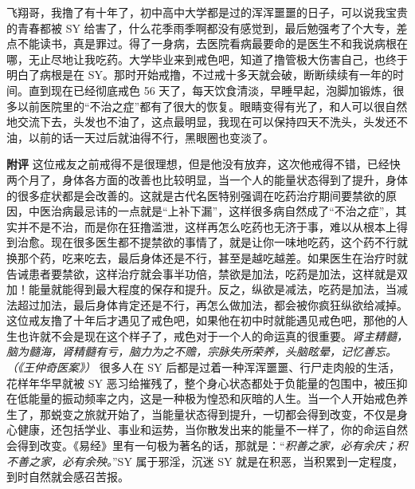 \begin{case}
    飞翔哥，我撸了有十年了，初中高中大学都是过的浑浑噩噩的日子，可以说我宝贵的青春都被 SY 给害了，什么花季雨季啊都没有感觉到，最后勉强考了个大专，差点不能读书，真是罪过。得了一身病，去医院看病最要命的是医生不和我说病根在哪，无止尽地让我吃药。大学毕业来到戒色吧，知道了撸管极大伤害自己，也终于明白了病根是在 SY。那时开始戒撸，不过戒十多天就会破，断断续续有一年的时间。直到现在已经彻底戒色 56 天了，每天饮食清淡，早睡早起，泡脚加锻炼，很多以前医院里的“不治之症”都有了很大的恢复。眼睛变得有光了，和人可以很自然地交流下去，头发也不油了，这点最明显，我现在可以保持四天不洗头，头发还不油，以前的话一天过后就油得不行，黑眼圈也变淡了。

    \textbf{附评} 这位戒友之前戒得不是很理想，但是他没有放弃，这次他戒得不错，已经快两个月了，身体各方面的改善也比较明显，当一个人的能量状态得到了提升，身体的很多症状都是会改善的。这就是古代名医特别强调在吃药治疗期间要禁欲的原因，中医治病最忌讳的一点就是“上补下漏”，这样很多病自然成了“不治之症”，其实并不是不治，而是你在狂撸滥泄，这样再怎么吃药也无济于事，难以从根本上得到治愈。现在很多医生都不提禁欲的事情了，就是让你一味地吃药，这个药不行就换那个药，吃来吃去，最后身体还是不行，甚至是越吃越差。如果医生在治疗时就告诫患者要禁欲，这样治疗就会事半功倍，禁欲是加法，吃药是加法，这样就是双加！能量就能得到最大程度的保存和提升。反之，纵欲是减法，吃药是加法，当减法超过加法，最后身体肯定还是不行，再怎么做加法，都会被你疯狂纵欲给减掉。这位戒友撸了十年后才遇见了戒色吧，如果他在初中时就能遇见戒色吧，那他的人生也许就不会是现在这个样子了，戒色对于一个人的命运真的很重要。\textit{肾主精髓，脑为髓海，肾精髓有亏，脑力为之不赡，宗脉失所荣养，头脑眩晕，记忆善忘。（《王仲奇医案》）} 很多人在 SY 后都是过着一种浑浑噩噩、行尸走肉般的生活，花样年华早就被 SY 恶习给摧残了，整个身心状态都处于负能量的包围中，被压抑在低能量的振动频率之内，这是一种极为惶恐和灰暗的人生。当一个人开始戒色养生了，那蜕变之旅就开始了，当能量状态得到提升，一切都会得到改变，不仅是身心健康，还包括学业、事业和运势，当你散发出来的能量不一样了，你的命运自然会得到改变。《易经》里有一句极为著名的话，那就是：“\textit{积善之家，必有余庆；积不善之家，必有余殃。}”SY 属于邪淫，沉迷 SY 就是在积恶，当积累到一定程度，到时自然就会感召苦报。
\end{case}

